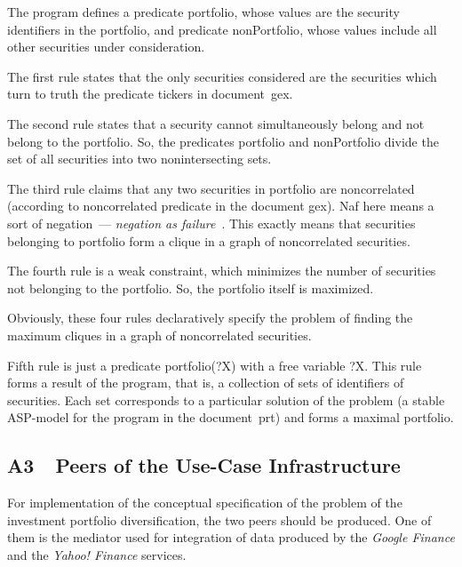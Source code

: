 \begin{multicols}{2}


{\small
  The program defines a predicate {\sf portfolio}, whose values are the security
identifiers in the portfolio, and predicate {\sf nonPortfolio}, whose values include all
other securities under consideration.

  The first rule states that the only securities considered are the securities which turn to
truth the predicate {\sf tickers} in document~{\sf gex}.

  The second rule states that a security cannot simultaneously belong and not
belong to the portfolio. So, the predicates {\sf portfolio} and {\sf nonPortfolio} divide
the set of all securities into two nonintersecting sets.

  The third rule claims that any two securities in {\sf portfolio} are {\sf noncorrelated}
(according to {\sf noncorrelated} predicate in the document {\sf gex}). {\sf Naf}
here means a sort of negation~--- \textit{negation as failure}~\cite{32-kal}. This
exactly means that securities belonging to {\sf portfolio} form a clique in a graph of
noncorrelated securities.
{

}

  The fourth rule is a weak constraint, which minimizes the number of securities not
belonging to the portfolio. So, the {\sf portfolio} itself is maximized.

  Obviously, these four rules declaratively specify the problem of finding the
maximum cliques in a graph of noncorrelated securities.

  Fifth rule is just a predicate {\sf portfolio(?X)} with a free variable {\sf ?X}. This
rule forms a result of the program, that is, a collection of sets of identifiers of
securities. Each set corresponds to a particular solution of the problem (a stable
  ASP-model for the program in the document~{\sf prt}) and forms a maximal
portfolio.

\subsection*{A3\ \ Peers of the Use-Case Infrastructure}

  \noindent
For implementation of the conceptual specification of the problem of the
investment portfolio diversification, the two peers should be produced. One of them is
the mediator used for integration of data produced by the \textit{Google Finance} and
the \textit{Yahoo! Finance} services. 

}
\end{multicols}
